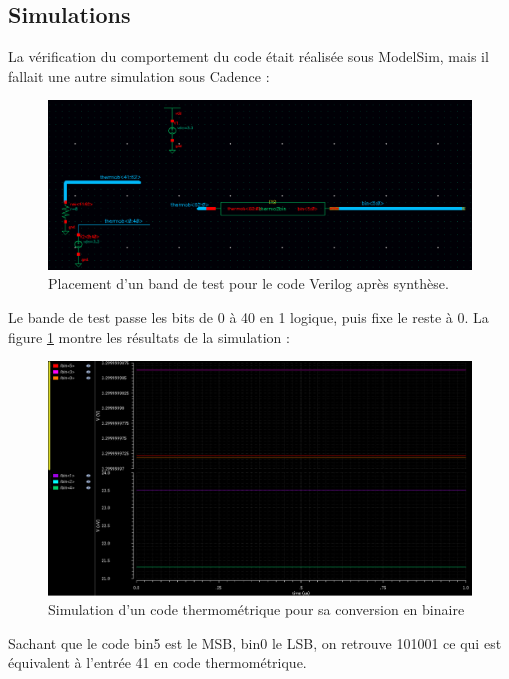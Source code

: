 \documentclass[11pt]{article}
\begin{document}
\clearpage
\subsection{Simulations}

La v\'erification du comportement du code \'etait r\'ealis\'ee sous ModelSim, mais il fallait une
autre simulation sous Cadence :

\begin{figure}[!htb]
      \centering
      \includegraphics[width=\linewidth]{test_thermo2bin.png}
      \caption{Placement d'un band de test pour le code Verilog apr\`es synth\`ese.}
\end{figure}%

Le bande de test passe les bits de 0 \`a 40 en 1 logique, puis fixe le reste \`a 0. La figure
\ref{fig:simT2B} montre les r\'esultats de la simulation :

\begin{figure}[!htb]
      \centering
      \includegraphics[width=\linewidth]{sim_thermo2bin.png}
      \caption{Simulation d'un code thermom\'etrique pour sa conversion en binaire}
      \label{fig:simT2B}
\end{figure}%

Sachant que le code bin5 est le MSB, bin0 le LSB, on retrouve 101001 ce qui est \'equivalent \`a
l'entr\'ee 41 en code thermom\'etrique.
\end{document}
